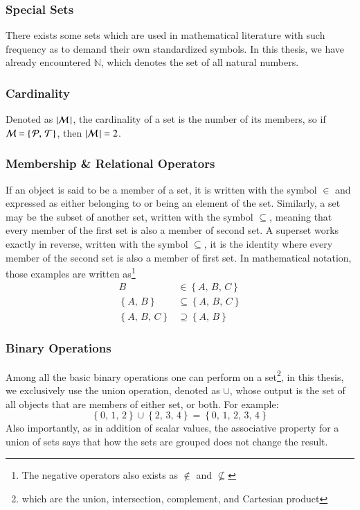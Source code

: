 %
\subsubsection{Special Sets}
There exists some sets which are used in mathematical literature with such frequency as to demand their own standardized symbols. In this thesis, we have already encountered $\mathbb{N}$, which denotes the set of all natural numbers.

%
\subsubsection{Cardinality}
Denoted as $|\mathcal{M}\,|$, the cardinality of a set is the number of its members, so if $\mathcal{M} = \left \{\,\mathcal{P},\,\mathcal{T}\right \}$, then $|\mathcal{M}\,| = 2$.

%
\subsubsection{Membership \& Relational Operators}
If an object is said to be a member of a set, it is written with the symbol $\in$ and expressed as either belonging to or being an element of the set. Similarly, a set may be the subset of another set, written with the symbol $\subseteq$, meaning that every member of the first set is also a member of second set. A superset works exactly in reverse, written with the symbol $\subseteq$, it is the identity where every member of the second set is also a member of first set. In mathematical notation, those examples are written as\footnote{The negative operators also exists as $\notin$ and $\nsubseteq$}
\begin{align}
	B & \in \left \{A,\,B,\,C\right \} \\
	\left \{A,\,B\right \} & \subseteq \left \{A,\,B,\,C\right \} \\
	\left \{A,\,B,\,C\right \} & \supseteq \left \{A,\,B\right \}
\end{align}

%
\subsubsection{Binary Operations}
Among all the basic binary operations one can perform on a set\footnote{which are the union, intersection, complement, and Cartesian product}, in this thesis, we exclusively use the union operation, denoted as $\cup$, whose output is the set of all objects that are members of either set, or both. For example:
\begin{equation}
	\left \{0,\,1,\,2\right \} \cup \left \{2,\,3,\,4\right \} = \left \{0,\,1,\,2,\,3,\,4\right \}
\end{equation}
Also importantly, as in addition of scalar values, the associative property for a union of sets says that how the sets are grouped does not change the result.

